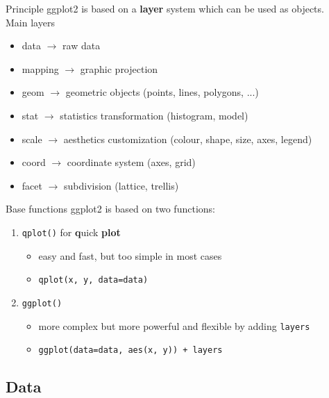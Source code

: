 \documentclass{beamer}\usepackage[]{graphicx}\usepackage[]{color}
\begin{document}
\begin{frame}{Principle}
ggplot2 is based on a \textbf{layer} system which can be used as objects.\\
\vspace{1cm}
Main layers
\begin{itemize}
\item data $\rightarrow$ raw data
\item mapping $\rightarrow$ graphic projection
\item geom $\rightarrow$ geometric objects (points, lines, polygons, ...)
\item stat $\rightarrow$ statistics transformation (histogram, model)
\item scale $\rightarrow$ aesthetics customization (colour, shape, size, axes, legend)
\item coord $\rightarrow$ coordinate system (axes, grid)
\item facet $\rightarrow$ subdivision (lattice, trellis)
\end{itemize}
\end{frame}

\begin{frame}{Base functions}
ggplot2 is based on two functions:
\vspace{0.5cm}
\begin{enumerate}
\item  \texttt{qplot()} for \textbf{q}uick \textbf{plot}
\begin{itemize}
\item easy and fast, but too simple in most cases
\item \texttt{qplot(x, y, data=data)}
\end{itemize}
\vspace{0.5cm}
\item \texttt{ggplot()}
\begin{itemize}
\item more complex but more powerful and flexible by adding \texttt{layers}
\item \texttt{ggplot(data=data, aes(x, y)) + layers}
\end{itemize}
\end{enumerate}
\end{frame}

\subsection{Data}
\end{document}
